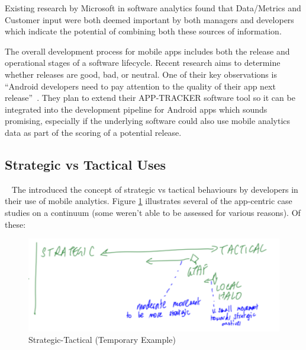Existing research by Microsoft in software analytics found that Data/Metrics and Customer input were both deemed important by both managers and developers which indicate the potential of combining both these sources of information.~

The overall development process for mobile apps includes both the release and operational stages of a software lifecycle. Recent research aims to determine whether releases are good, bad, or neutral. One of their key observations is ``Android developers need to pay attention to the quality of their app next release''~. They plan to extend their \uppercase{App-Tracker} software tool so it can be integrated into the development pipeline for Android apps which sounds promising, especially if the underlying software could also use mobile analytics data as part of the scoring of a potential release.


\subsection{Strategic vs Tactical Uses}~\label{aiu-strategic-vs-tactical-uses-topic}
The  introduced the concept of strategic vs tactical behaviours by developers in their use of mobile analytics. Figure \ref{fig:aiu-strategic-tactical-example} illustrates several of the app-centric case studies on a continuum (some weren't able to be assessed for various reasons). Of these:

\begin{figure}
    \centering
    \includegraphics[width=\linewidth]{images/rough-sketches/aiu-strategic-tactical-example.pdf}
    \caption{Strategic-Tactical (Temporary Example)}
    \label{fig:aiu-strategic-tactical-example}
\end{figure}

